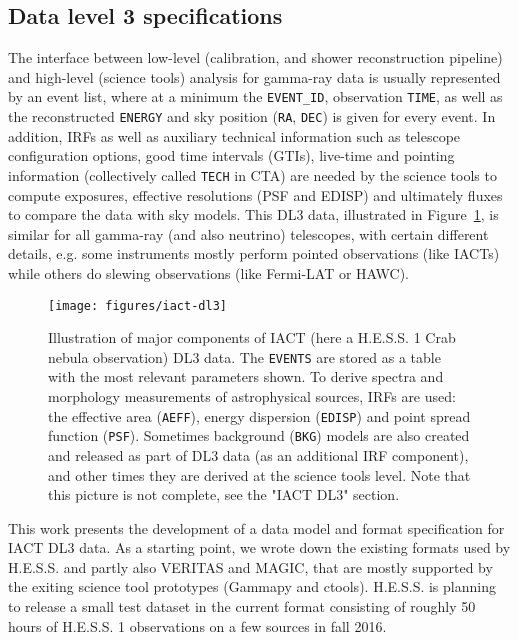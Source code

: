 \subsection{Data level 3 specifications}

The interface between low-level (calibration, and shower reconstruction pipeline) and high-level (science tools) analysis for gamma-ray data is usually represented by an event list, where at a minimum the \texttt{EVENT\_ID}, observation \texttt{TIME}, as well as the reconstructed \texttt{ENERGY} and sky position (\texttt{RA}, \texttt{DEC}) is given for every event. In addition, IRFs as well as auxiliary technical information such as telescope configuration options, good time intervals (GTIs), live-time and pointing information (collectively called \texttt{TECH} in CTA) are needed by the science tools to compute exposures, effective resolutions (PSF and EDISP) and ultimately fluxes to compare the data with sky models. This DL3 data, illustrated in Figure~\ref{fig:iact-dl3}, is similar for all gamma-ray (and also neutrino) telescopes, with certain different details, e.g. some instruments mostly perform pointed observations (like IACTs) while others do slewing observations (like Fermi-LAT or HAWC).

\begin{figure}[tb]
\centerline{\texttt{[image: figures/iact-dl3]}}
\caption{
Illustration of major components of IACT (here a H.E.S.S. 1 Crab nebula observation) DL3 data. The \texttt{EVENTS} are stored as a table with the most relevant parameters shown. To derive spectra and morphology measurements of astrophysical sources, IRFs are used: the effective area (\texttt{AEFF}), energy dispersion (\texttt{EDISP}) and point spread function (\texttt{PSF}). Sometimes background (\texttt{BKG}) models are also created and released as part of DL3 data (as an additional IRF component), and other times they are derived at the science tools level. Note that this picture is not complete, see the "IACT DL3" section.
}
\label{fig:iact-dl3}
\end{figure}

This work presents the development of a data model and format specification for IACT DL3 data. As a starting point, we wrote down the existing formats used by H.E.S.S. and partly also VERITAS and MAGIC, that are mostly supported by the exiting science tool prototypes (Gammapy and ctools). H.E.S.S. is planning to release a small test dataset in the current format consisting of roughly 50 hours of H.E.S.S. 1 observations on a few sources in fall 2016.

